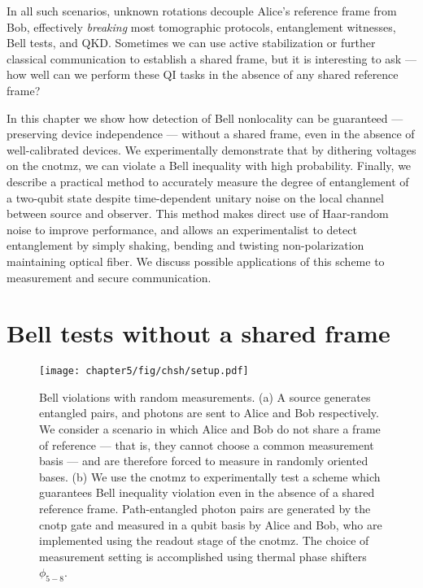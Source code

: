 In all such scenarios, unknown rotations decouple Alice's reference frame from Bob, effectively \emph{breaking} most tomographic protocols, entanglement witnesses, Bell tests, and QKD. Sometimes we can use active stabilization or further classical communication to establish a shared frame, but it is interesting to ask --- how well can we perform these QI tasks in the absence of any shared reference frame?

In this chapter we show how detection of Bell nonlocality can be guaranteed --- preserving device independence --- without a shared frame, even in the absence of well-calibrated devices. We experimentally demonstrate that by dithering voltages on the \acrshort{cnotmz}, we can violate a Bell inequality with high probability.  Finally, we describe a practical method to accurately measure the degree of entanglement of a two-qubit state despite time-dependent unitary noise on the local channel between source and observer. This method makes direct use of Haar-random noise to improve performance,  and allows an experimentalist to detect entanglement by simply shaking, bending and twisting non-polarization maintaining optical fiber. We discuss possible applications of this scheme to measurement and secure communication.

\section{Bell tests without a shared frame} 
\label{sec:random-chsh-calibrated}

\begin{figure}[!t]
\centering
\texttt{[image: chapter5/fig/chsh/setup.pdf]}
\caption[Experimental setup]{
\label{fig:random-chsh-setup}  
Bell violations with random measurements. (a)
A source generates entangled pairs, and photons are sent to Alice and Bob respectively. We consider a scenario in which Alice and Bob do not share a frame of reference --- that is, they cannot choose a common measurement basis --- and are therefore forced to measure in randomly oriented bases. (b) We use the \acrshort{cnotmz} to experimentally test a scheme which guarantees Bell inequality violation even in the absence of a shared reference frame. Path-entangled photon pairs are generated by the \acrshort{cnotp} gate and measured in a qubit basis by Alice and Bob, who are implemented using the readout stage of the \acrshort{cnotmz}. The choice of measurement setting is accomplished using thermal phase shifters $\phi_{5-8}$. 
} 
\end{figure}

